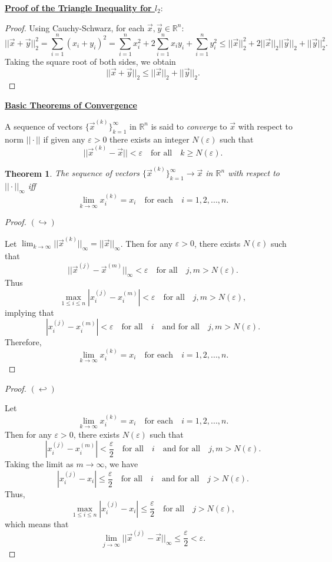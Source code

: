 \documentclass[12pt]{article}
\newcommand{\vecx}{\ensuremath{\vec{x}}}
\newcommand{\vecy}{\ensuremath{\vec{y}}}
\newtheorem{theorem}{Theorem}
\newenvironment{definition}[1][Definition]{\begin{trivlist}
\item[\hskip \labelsep {\bfseries #1}]}{\end{trivlist}}
\begin{document}
\vspace*{1em}
\underline{\textbf{Proof of the Triangle Inequality for $l_2$}}:
\begin{proof}
Using Cauchy-Schwarz, for each $\vecx,\vecy \in \mathbb{R}^n$:
\[
||\vecx + \vecy||_2^2 = \sum_{i=1}^n(x_i+y_i)^2 = \sum_{i=1}^nx_i^2 + 2\sum_{i=1}^nx_iy_i + \sum_{i=1}^ny_i^2 \leq ||\vecx||_2^2 + 2||\vecx||_2||\vecy||_2 + ||\vecy||_2^2.
\]
Taking the square root of both sides, we obtain
\[
||\vecx + \vecy||_2 \leq ||\vecx||_2+||\vecy||_2.
\]
\end{proof}

\vspace*{1em}
\underline{\textbf{Basic Theorems of Convergence}}

\begin{definition}
A sequence of vectors $\{\vecx^{(k)}\}_{k=1}^\infty$ in $\mathbb{R}^n$ is said to \textit{converge} to $\vecx$ with respect to norm $||\cdot||$ if given any $\varepsilon > 0$ there exists an integer $N(\varepsilon)$ such that
\[
||\vecx^{(k)} - \vecx|| < \varepsilon \quad \text{for all}  \quad k\geq N(\varepsilon).
\]
\end{definition}

\begin{theorem}
The sequence of vectors $\{\vecx^{(k)}\}_{k=1}^\infty\rightarrow \vecx$ in $\mathbb{R}^n$ with respect to $||\cdot ||_\infty$ iff
\[
\lim_{k\rightarrow\infty}x_i^{(k)} = x_i \quad \text{for each} \quad i=1,2,...,n.
\]
\end{theorem}
\pagebreak

\begin{proof}
$(\hookrightarrow)$

Let $\displaystyle{\lim_{k\rightarrow\infty}}||\vecx^{(k)}||_\infty = ||\vecx||_\infty$. Then for any $\varepsilon > 0$, there exists $N(\varepsilon)$ such that
\[
||\vecx^{(j)}-\vecx^{(m)}||_\infty <\varepsilon \quad \text{for all}\quad j,m > N(\varepsilon).
\]
Thus
\[
\max_{1\leq i\leq n}|x_i^{(j)}-x_i^{(m)}| <\varepsilon\quad \text{for all}\quad j,m > N(\varepsilon),
\]
implying that
\[
|x_i^{(j)}-x_i^{(m)}| <\varepsilon\quad \text{for all}\quad i \quad \text{and for all}\quad j,m > N(\varepsilon).
\]
Therefore,
\[
\lim_{k\rightarrow\infty}x_i^{(k)} = x_i \quad \text{for each} \quad i=1,2,...,n.
\]
\end{proof}
\begin{proof}
$(\hookleftarrow)$

Let
\[
\lim_{k\rightarrow\infty}x_i^{(k)} = x_i \quad \text{for each} \quad i=1,2,...,n.
\]
Then for any $\varepsilon > 0$, there exists $N(\varepsilon)$ such that
\[
|x_i^{(j)}-x_i^{(m)}| <\frac{\varepsilon}{2}\quad \text{for all}\quad i \quad \text{and for all}\quad j,m > N(\varepsilon).
\]
Taking the limit as $m\rightarrow\infty$, we have
\[
|x_i^{(j)}-x_i| \leq \frac{\varepsilon}{2}\quad \text{for all}\quad i \quad \text{and for all}\quad j > N(\varepsilon).
\]
Thus,
\[
\max_{1\leq i \leq n}|x_i^{(j)}-x_i| \leq \frac{\varepsilon}{2}\quad \text{for all}\quad j > N(\varepsilon),
\]
which means that
\[
\lim_{j\rightarrow\infty}||\vecx^{(j)}-\vecx||_\infty \leq \frac{\varepsilon}{2} < \varepsilon.
\]
\end{proof}
\end{document}
